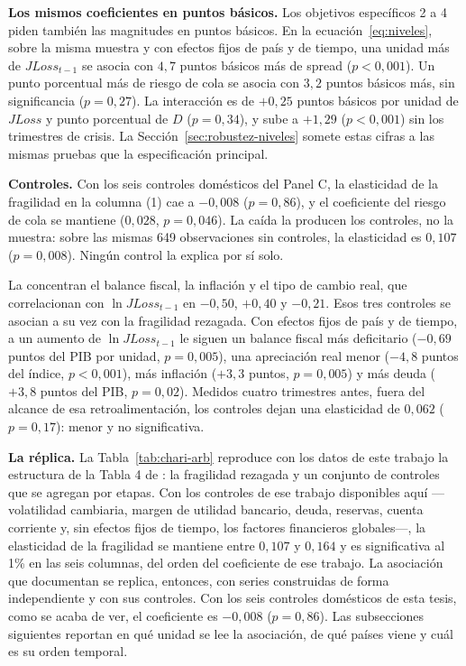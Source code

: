 \textbf{Los mismos coeficientes en puntos básicos.} Los objetivos específicos 2 a 4 piden también las magnitudes en puntos básicos. En la ecuación~\eqref{eq:niveles}, sobre la misma muestra y con efectos fijos de país y de tiempo, una unidad más de $JLoss_{t-1}$ se asocia con $4{,}7$ puntos básicos más de spread ($p<0{,}001$). Un punto porcentual más de riesgo de cola se asocia con $3{,}2$ puntos básicos más, sin significancia ($p=0{,}27$). La interacción es de $+0{,}25$ puntos básicos por unidad de $JLoss$ y punto porcentual de $D$ ($p=0{,}34$), y sube a $+1{,}29$ ($p<0{,}001$) sin los trimestres de crisis. La Sección~\ref{sec:robustez-niveles} somete estas cifras a las mismas pruebas que la especificación principal.

\textbf{Controles.} Con los seis controles domésticos del Panel C, la elasticidad de la fragilidad en la columna (1) cae a $-0{,}008$ ($p=0{,}86$), y el coeficiente del riesgo de cola se mantiene ($0{,}028$, $p=0{,}046$). La caída la producen los controles, no la muestra: sobre las mismas 649 observaciones sin controles, la elasticidad es $0{,}107$ ($p=0{,}008$). Ningún control la explica por sí solo.

La concentran el balance fiscal, la inflación y el tipo de cambio real, que correlacionan con $\ln JLoss_{t-1}$ en $-0{,}50$, $+0{,}40$ y $-0{,}21$. Esos tres controles se asocian a su vez con la fragilidad rezagada. Con efectos fijos de país y de tiempo, a un aumento de $\ln JLoss_{t-1}$ le siguen un balance fiscal más deficitario ($-0{,}69$ puntos del PIB por unidad, $p=0{,}005$), una apreciación real menor ($-4{,}8$ puntos del índice, $p<0{,}001$), más inflación ($+3{,}3$ puntos, $p=0{,}005$) y más deuda ($+3{,}8$ puntos del PIB, $p=0{,}02$). Medidos cuatro trimestres antes, fuera del alcance de esa retroalimentación, los controles dejan una elasticidad de $0{,}062$ ($p=0{,}17$): menor y no significativa.

\textbf{La réplica.} La Tabla~\ref{tab:chari-arb} reproduce con los datos de este trabajo la estructura de la Tabla 4 de \citet{Chari2024b}: la fragilidad rezagada y un conjunto de controles que se agregan por etapas. Con los controles de ese trabajo disponibles aquí ---volatilidad cambiaria, margen de utilidad bancario, deuda, reservas, cuenta corriente y, sin efectos fijos de tiempo, los factores financieros globales---, la elasticidad de la fragilidad se mantiene entre $0{,}107$ y $0{,}164$ y es significativa al 1\% en las seis columnas, del orden del coeficiente de ese trabajo. La asociación que documentan \citet{Chari2024b} se replica, entonces, con series construidas de forma independiente y con sus controles. Con los seis controles domésticos de esta tesis, como se acaba de ver, el coeficiente es $-0{,}008$ ($p=0{,}86$). Las subsecciones siguientes reportan en qué unidad se lee la asociación, de qué países viene y cuál es su orden temporal.


